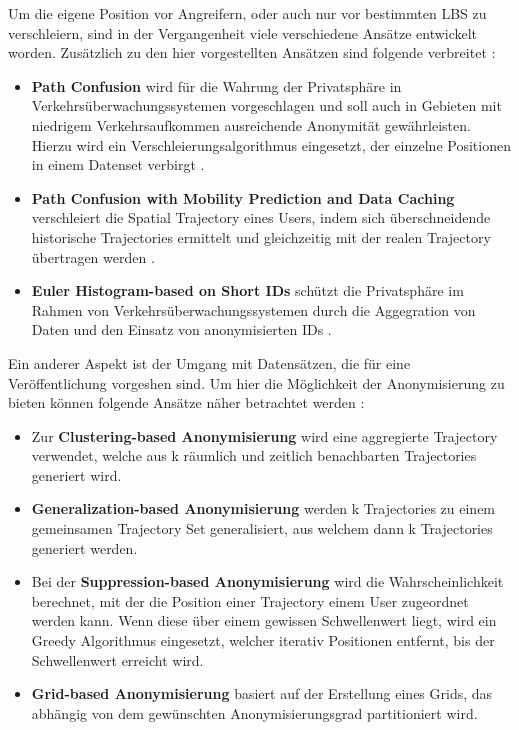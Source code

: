 Um die eigene Position vor Angreifern, oder auch nur vor bestimmten LBS zu verschleiern, sind in der Vergangenheit viele verschiedene Ansätze entwickelt worden. Zusätzlich zu den hier vorgestellten Ansätzen sind folgende verbreitet \cite{Chow2011}:
\begin{itemize}
\item{\textbf{Path Confusion}} wird für die Wahrung der Privatsphäre in Verkehrsüberwachungssystemen vorgeschlagen und soll auch in Gebieten mit niedrigem Verkehrsaufkommen ausreichende Anonymität gewährleisten. Hierzu wird ein Verschleierungsalgorithmus eingesetzt, der einzelne Positionen in einem Datenset verbirgt \cite{Hoh2007}.
\item{\textbf{Path Confusion with Mobility Prediction and Data Caching}} verschleiert die Spatial Trajectory eines Users, indem sich überschneidende historische Trajectories ermittelt und gleichzeitig mit der realen Trajectory übertragen werden \cite{Meyerowitz2009}.
\item{\textbf{Euler Histogram-based on Short IDs}} schützt die Privatsphäre im Rahmen von Verkehrsüberwachungssystemen durch die Aggegration von Daten und den Einsatz von anonymisierten IDs \cite{Xie2010}.
\end{itemize}
Ein anderer Aspekt ist der Umgang mit Datensätzen, die für eine Veröffentlichung vorgeshen sind. Um hier die Möglichkeit der Anonymisierung zu bieten können folgende Ansätze näher betrachtet werden \cite{Chow2011}:
\begin{itemize}
\item {} Zur \textbf{Clustering-based Anonymisierung} wird eine aggregierte Trajectory verwendet, welche aus k räumlich und zeitlich benachbarten Trajectories generiert wird.
\item{\textbf{Generalization-based Anonymisierung}} werden k Trajectories zu einem gemeinsamen Trajectory Set generalisiert, aus welchem dann k Trajectories generiert werden.
\item{} Bei der \textbf{Suppression-based Anonymisierung} wird die Wahrscheinlichkeit berechnet, mit der die Position einer Trajectory einem User zugeordnet werden kann. Wenn diese über einem gewissen Schwellenwert liegt, wird ein Greedy Algorithmus eingesetzt, welcher iterativ Positionen entfernt, bis der Schwellenwert erreicht wird.
\item{\textbf{Grid-based Anonymisierung}} basiert auf der Erstellung eines Grids, das abhängig von dem gewünschten Anonymisierungsgrad partitioniert wird.
\end{itemize}